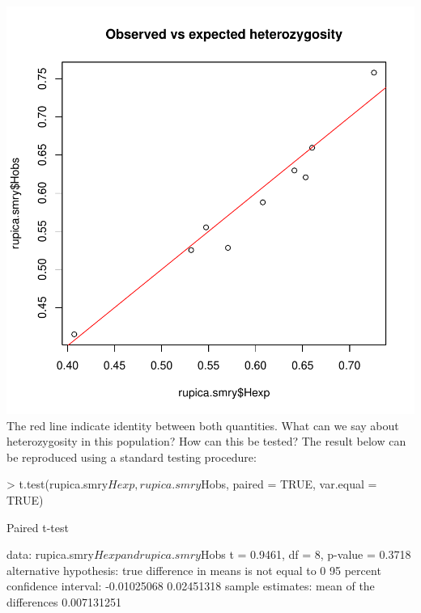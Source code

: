 \documentclass{article}
\begin{document}
\includegraphics{figs/spca-025}
The red line indicate identity between both quantities.
What can we say about heterozygosity in this population?
How can this be tested?
The result below can be reproduced using a standard testing procedure:
\begin{Schunk}
\begin{Sinput}
> t.test(rupica.smry$Hexp, rupica.smry$Hobs, paired = TRUE, var.equal = TRUE)
\end{Sinput}
\begin{Soutput}
	Paired t-test

data:  rupica.smry$Hexp and rupica.smry$Hobs 
t = 0.9461, df = 8, p-value = 0.3718
alternative hypothesis: true difference in means is not equal to 0 
95 percent confidence interval:
 -0.01025068  0.02451318 
sample estimates:
mean of the differences 
            0.007131251 
\end{Soutput}
\end{Schunk}
~\\
\end{document}
